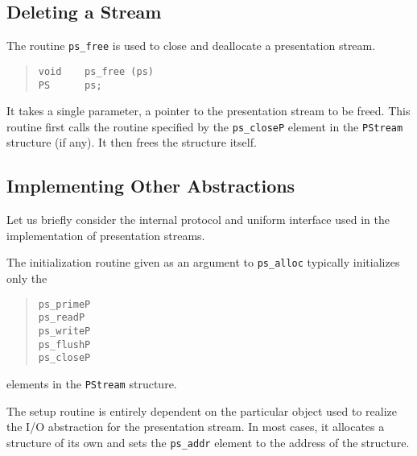 \subsection	{Deleting a Stream}
The routine \verb"ps_free" is used to close and deallocate a presentation
stream.
\begin{quote}\small\begin{verbatim}
void    ps_free (ps)
PS      ps;
\end{verbatim}\end{quote}
It takes a single parameter,
a pointer to the presentation stream to be freed.
This routine first calls the routine specified by the \verb"ps_closeP"
element in the \verb"PStream" structure (if any).
It then frees the structure itself.

\subsection	{Implementing Other Abstractions}
Let us briefly consider the internal protocol and uniform interface used in
the implementation of presentation streams.

The initialization routine given as an argument to \verb"ps_alloc" typically
initializes only the
\begin{quote}\small\begin{verbatim}
ps_primeP
ps_readP
ps_writeP
ps_flushP
ps_closeP
\end{verbatim}\end{quote}
elements in the \verb"PStream" structure.

The setup routine is entirely dependent on the particular object used to
realize the I/O abstraction for the presentation stream.
In most cases, it allocates a structure of its own and sets the
\verb"ps_addr" element to the address of the structure.

